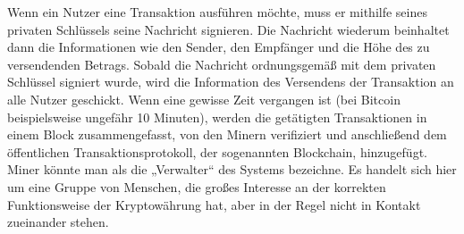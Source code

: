 \documentclass[12pt]{article}
\begin{document}
Wenn ein Nutzer eine Transaktion ausführen möchte, muss er mithilfe seines privaten Schlüssels seine Nachricht signieren. Die Nachricht wiederum beinhaltet dann die Informationen wie den Sender, den Empfänger und die Höhe des zu versendenden Betrags. Sobald die Nachricht ordnungsgemäß mit dem privaten Schlüssel signiert wurde, wird die Information des Versendens der Transaktion an alle Nutzer geschickt. Wenn eine gewisse Zeit vergangen ist (bei Bitcoin beispielsweise ungefähr 10 Minuten), werden die getätigten Transaktionen in einem Block zusammengefasst, von den Minern verifiziert und anschließend dem öffentlichen Transaktionsprotokoll, der sogenannten Blockchain, hinzugefügt. Miner könnte man als die „Verwalter“ des Systems bezeichne. Es handelt sich hier um eine Gruppe von Menschen, die großes Interesse an der korrekten Funktionsweise der Kryptowährung hat, aber in der Regel nicht in Kontakt zueinander stehen.
\end{document}
